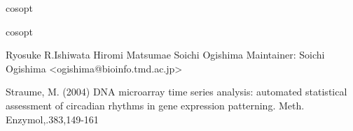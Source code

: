 \begin{Description}\relax
cosopt
\end{Description}
\begin{Details}\relax
cosopt
\end{Details}
\begin{Author}\relax
Ryosuke R.Ishiwata
Hiromi Matsumae
Soichi Ogishima
Maintainer: Soichi Ogishima <ogishima@bioinfo.tmd.ac.jp>
\end{Author}
\begin{References}\relax
Straume, M. (2004) DNA microarray time series analysis: automated statistical assessment of circadian rhythms in gene expression patterning. Meth. Enzymol,.383,149-161
\end{References}

